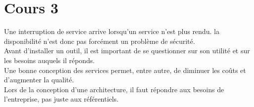\section{Cours 3}
Une interruption de service arrive lorsqu'un service n'est plus rendu. la disponibilit\'e n'est donc pas forc\'ement un
probl\`eme de s\'ecurit\'e.\\
Avant d'installer un outil, il est important de se questionner sur son utilit\'e et sur les besoins auquels il
r\'eponds.\\
Une bonne conception des services permet, entre autre, de diminuer les co\^uts et d'augmenter la qualit\'e.\\
Lors de la conception d'une architecture, il faut r\'epondre aux besoins de l'entreprise, pas juste aux
r\'ef\'erentiels.
